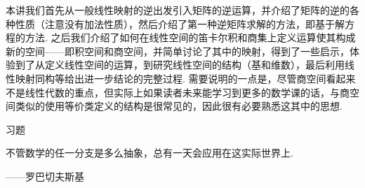 本讲我们首先从一般线性映射的逆出发引入矩阵的逆运算，并介绍了矩阵的逆的各种性质（注意没有加法性质），然后介绍了第一种逆矩阵求解的方法，即基于解方程的方法. 之后我们介绍了如何在线性空间的笛卡尔积和商集上定义运算使其构成新的空间——即积空间和商空间，并简单讨论了其中的映射，得到了一些启示，体验到了从定义线性空间的运算，到研究线性空间的结构（基和维数），最后利用线性映射同构等给出进一步结论的完整过程. 需要说明的一点是，尽管商空间看起来不是线性代数的重点，但实际上如果读者未来能学习到更多的数学课的话，与商空间类似的使用等价类定义的结构是很常见的，因此很有必要熟悉这其中的思想.

\vspace{2ex}
\centerline{\heiti \Large 习题}

\vspace{2ex}
{\kaishu 不管数学的任一分支是多么抽象，总有一天会应用在这实际世界上.}
\begin{flushright}
    \kaishu
    ——罗巴切夫斯基
\end{flushright}

